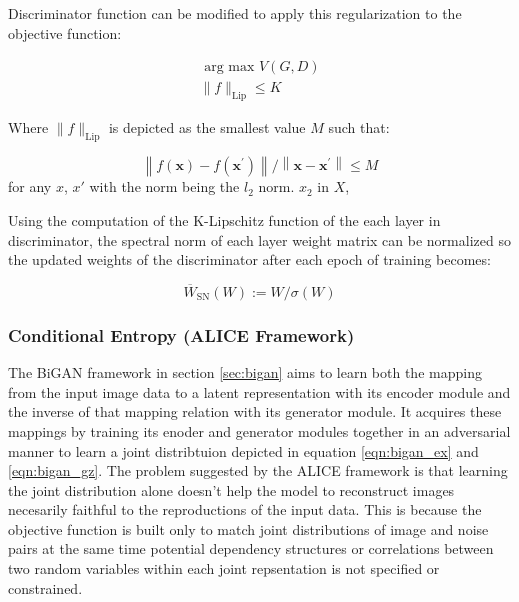 Discriminator function can be modified to apply this regularization to the objective function: 
    
\begin{equation}
\begin{array}{l}{\text { arg max } V(G, D)} \\ {\|f\|_{\mathrm{Lip}} \leq K}\end{array} 
\end{equation}

Where $\|f\|_{\mathrm{Lip}}$ is depicted as the smallest value $M$ such that: 

\begin{equation}
    \left\|f(\boldsymbol{x})-f\left(\boldsymbol{x}^{\prime}\right)\right\| /\left\|\boldsymbol{x}-\boldsymbol{x}^{\prime}\right\| \leq M 
\end{equation}
for any $x$, $x'$ with the norm being the $l_2$ norm. $x_2$ in $X$,\cite{sohrab2011basic}

Using the computation of the K-Lipschitz function of the each layer in discriminator, the spectral
norm of each layer weight matrix can be normalized so the updated weights of the discriminator after
each epoch of training becomes:

\begin{equation}
    \overline{W}_{\mathrm{SN}}(W) :=W / \sigma(W) 
\end{equation}



\subsubsection{Conditional Entropy (ALICE Framework)}
\label{sec:alad_alice}

The BiGAN framework in section \ref{sec:bigan} aims to learn both the mapping from the input image
data to a latent representation with its encoder module and the inverse of that mapping relation
with its generator module. It acquires these mappings by training its enoder and generator modules
together in an adversarial manner to learn a joint distribtuion depicted in equation
\ref{eqn:bigan_ex} and \ref{eqn:bigan_gz}. The problem suggested by the ALICE
framework\cite{Li2017TowardsUA} is that learning the joint distribution alone doesn't help the model
to reconstruct images necesarily faithful to the reproductions of the input data.
\cite{Li2017TowardsUA} This is because the objective function is built only to match joint
distributions of image and noise pairs at the same time potential dependency structures or
correlations between two random variables within each joint repsentation is not specified or
constrained. \cite{Li2017TowardsUA}


